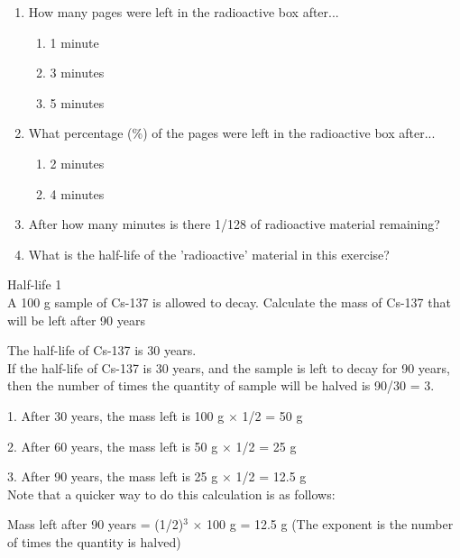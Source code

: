 {\begin{enumerate}
\item{How many pages were left in the radioactive box after...
	\begin{enumerate}
	\item{1 minute}
	\item{3 minutes}
	\item{5 minutes}
	\end{enumerate}
}
\item{What percentage (\%) of the pages were left in the radioactive box after...
	\begin{enumerate}
	\item{2 minutes}
	\item{4 minutes}
	\end{enumerate}
}
\item{After how many minutes is there 1/128 of radioactive material remaining?}
\item{What is the half-life of the 'radioactive' material in this exercise?}
\end{enumerate}
}


\begin{wex}{Half-life 1\\}{A 100 g sample of Cs-137 is allowed to decay. Calculate the mass of Cs-137 that will be left after 90 years\\}

{
The half-life of Cs-137 is 30 years.\\
} 
{
If the half-life of Cs-137 is 30 years, and the sample is left to decay for 90 years, then the number of times the quantity of sample will be halved is 90/30 = 3.\\
}
{
1. After 30 years, the mass left is 100 g $\times$ 1/2 = 50 g

2. After 60 years, the mass left is 50 g $\times$ 1/2 = 25 g

3. After 90 years, the mass left is 25 g $\times$ 1/2 = 12.5 g\\

Note that a quicker way to do this calculation is as follows:

Mass left after 90 years = (1/2)$^{3}$ $\times$ 100 g = 12.5 g (The exponent is the number of times the quantity is halved)

}
\end{wex}

